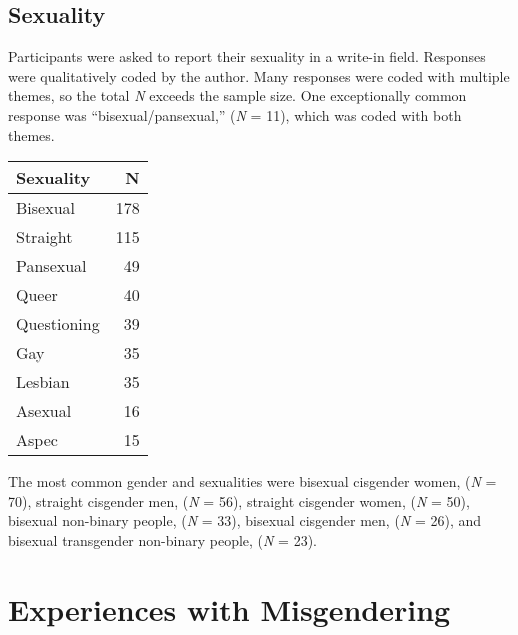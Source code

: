 \documentclass[12pt,twoside]{reedthesis}
\begin{document}
\hypertarget{sexuality}{%
\subsection{Sexuality}\label{sexuality}}

Participants were asked to report their sexuality in a write-in field. Responses were qualitatively coded by the author. Many responses were coded with multiple themes, so the total \emph{N} exceeds the sample size. One exceptionally common response was ``bisexual/pansexual,'' (\emph{N} = 11), which was coded with both themes.
\begin{tabular}{l|r}
\hline
Sexuality & N\\
\hline
Bisexual & 178\\
\hline
Straight & 115\\
\hline
Pansexual & 49\\
\hline
Queer & 40\\
\hline
Questioning & 39\\
\hline
Gay & 35\\
\hline
Lesbian & 35\\
\hline
Asexual & 16\\
\hline
Aspec & 15\\
\hline
\end{tabular}
The most common gender and sexualities were bisexual cisgender women, (\emph{N} = 70), straight cisgender men, (\emph{N} = 56), straight cisgender women, (\emph{N} = 50), bisexual non-binary people, (\emph{N} = 33), bisexual cisgender men, (\emph{N} = 26), and bisexual transgender non-binary people, (\emph{N} = 23).

\hypertarget{experiences-with-misgendering}{%
\section{Experiences with Misgendering}\label{experiences-with-misgendering}}
\end{document}
